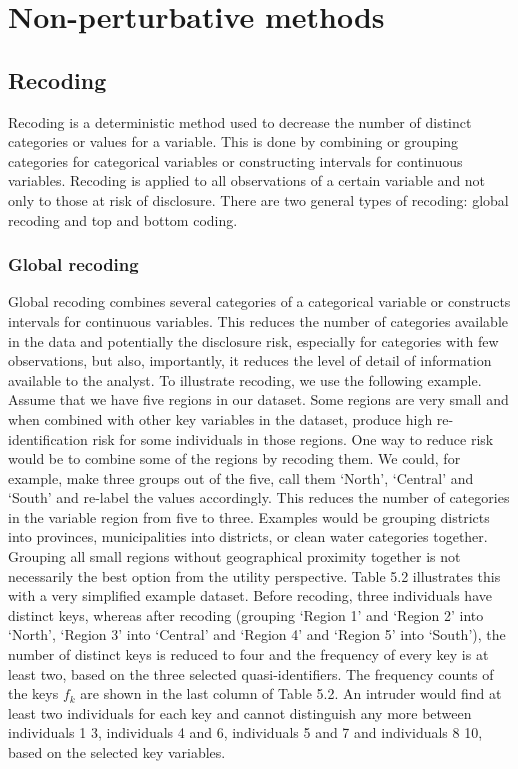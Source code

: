 \documentclass[letterpaper,10pt,english]{sphinxmanual}
\begin{document}
\section{Non-perturbative methods}
\label{\detokenize{anon_methods:non-perturbative-methods}}

\subsection{Recoding}
\label{\detokenize{anon_methods:recoding}}
Recoding is a deterministic method used to decrease the number of
distinct categories or values for a variable. This is done by combining
or grouping categories for categorical variables or constructing
intervals for continuous variables. Recoding is applied to all
observations of a certain variable and not only to those at risk of
disclosure. There are two general types of recoding: global recoding and
top and bottom coding.


\subsubsection{Global recoding}
\label{\detokenize{anon_methods:global-recoding}}
Global recoding combines several categories of a categorical variable or
constructs intervals for continuous variables. This reduces the number
of categories available in the data and potentially the disclosure risk,
especially for categories with few observations, but also, importantly,
it reduces the level of detail of information available to the analyst.
To illustrate recoding, we use the following example. Assume that we
have five regions in our dataset. Some regions are very small and when
combined with other key variables in the dataset, produce high
re-identification risk for some individuals in those regions. One way to
reduce risk would be to combine some of the regions by recoding them. We
could, for example, make three groups out of the five, call them
‘North’, ‘Central’ and ‘South’ and re-label the values accordingly. This
reduces the number of categories in the variable region from five to
three.  Examples would be grouping districts
into provinces, municipalities into districts, or clean water categories
together. Grouping all small regions without geographical proximity
together is not necessarily the best option from the utility
perspective. Table 5.2 illustrates this with a very simplified example
dataset. Before recoding, three individuals have distinct keys, whereas
after recoding (grouping ‘Region 1’ and ‘Region 2’ into ‘North’, ‘Region
3’ into ‘Central’ and ‘Region 4’ and ‘Region 5’ into ‘South’), the
number of distinct keys is reduced to four and the frequency of every
key is at least two, based on the three selected quasi-identifiers. The
frequency counts of the keys \(f_{k}\) are shown in the last column
of Table 5.2. An intruder would find at least two individuals for each
key and cannot distinguish any more between individuals 1 \textendash{} 3,
individuals 4 and 6, individuals 5 and 7 and individuals 8 \textendash{} 10, based
on the selected key variables.
\end{document}
